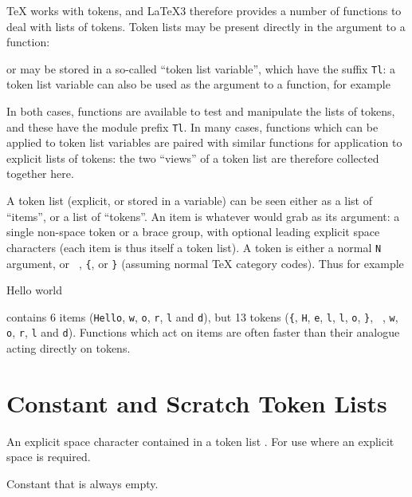 \documentclass[oneside]{book}
\begin{document}
\TeX{} works with tokens, and \LaTeX3 therefore provides a number of
functions to deal with lists of tokens.  Token lists may be present
directly in the argument to a function:
\begin{codehigh}
\end{codehigh}
or may be stored in a so-called \enquote{token list variable}, which
have the suffix \texttt{Tl}: a token list variable can also be used as
the argument to a function, for example
\begin{codehigh}
\TlVarFoo \lSomeTl
\end{codehigh}
In both cases, functions are available to test and manipulate the lists
of tokens, and these have the module prefix \texttt{Tl}.
In many cases, functions which can be applied to token list variables
are paired with similar functions for application to explicit lists
of tokens: the two \enquote{views} of a token list are therefore collected
together here.

A token list (explicit, or stored in a variable) can be seen either
as a list of \enquote{items},
or a list of \enquote{tokens}. An item is whatever  would
grab as its argument: a single non-space token or a brace group,
with optional leading explicit space characters (each item is thus
itself a token list). A token is either a normal \texttt{N} argument,
or \verb*| |, \verb|{|, or \verb|}| (assuming normal \TeX{} category codes).
Thus for example
\begin{codehigh}
{Hello} world
\end{codehigh}
contains 6 items (\texttt{Hello}, \texttt{w}, \texttt{o}, \texttt{r},
\texttt{l} and \texttt{d}), but 13 tokens (\verb|{|, \texttt{H}, \texttt{e},
\texttt{l}, \texttt{l}, \texttt{o}, \verb|}|, \verb*| |, \texttt{w}, \texttt{o},
\texttt{r}, \texttt{l} and \texttt{d}).
Functions which act on items are often faster than their analogue acting
directly on tokens.

\section{Constant and Scratch Token Lists}

\begin{variable}{\cSpaceTl}
An explicit space character contained in a token list%
. For use where an explicit space is required.
\end{variable}

\begin{variable}{\cEmptyTl}
Constant that is always empty.
\end{variable}
\end{document}
